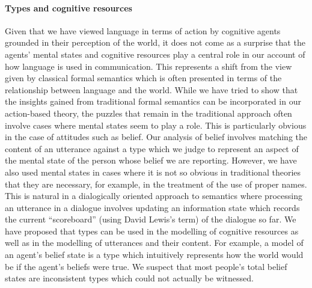 \paragraph{Types and cognitive resources}  Given that we have viewed
language in terms of action by cognitive agents grounded in their
perception of the world, it does not come as a surprise that the
agents' mental states and cognitive resources play a central role in
our account of how language is used in communication.  This represents
a shift from the view given by classical formal semantics which is
often presented in terms of the relationship between language and the
world.  While we have tried to show that the insights gained from 
traditional formal semantics can be incorporated in our
action-based theory, the puzzles that remain in the traditional
approach often involve cases where mental states seem to play a role.
This is particularly obvious in the case of attitudes such as belief.
Our analysis of belief involves matching the content of an utterance
against a type which we judge to represent an aspect of the mental
state of the person whose belief we are reporting.  However, we have
also used mental states in cases where it is not so obvious in
traditional theories that they are necessary, for example, in the
treatment of the use of proper names.  This is natural in a
dialogically oriented approach to semantics where processing an
utterance in a dialogue involves updating an information state which
records the current ``scoreboard'' (using David Lewis's term) of the
dialogue so far.  We have proposed that types can be used in the
modelling of cognitive resources as well as in the modelling of
utterances and their content.  For example, a model of an agent's
belief state is a type which intuitively represents how the world would be if the
agent's beliefs were true.  We suspect that most people's total belief
states are inconsistent types which could not actually be witnessed.



